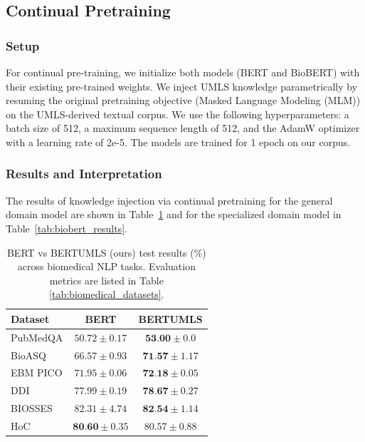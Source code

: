 \documentclass[10pt, a4paper]{article}
\begin{document}
\subsection{Continual Pretraining}
\subsubsection{Setup}
For continual pre-training, we initialize both models (BERT and BioBERT) with their existing pre-trained weights. We inject UMLS knowledge parametrically by resuming the original pretraining objective (Masked Language Modeling (MLM)) on the UMLS-derived textual corpus. We use the following hyperparameters: a batch size of 512, a maximum sequence length of 512, and the AdamW optimizer with a learning rate of 2e-5. The models are trained for 1 epoch on our corpus.
\subsubsection{Results and Interpretation}
The results of knowledge injection via continual pretraining for the general domain model are shown in Table~\ref{tab:bert_results} and for the specialized domain model in Table~\ref{tab:biobert_results}.
\begin{table}[H]
\centering
\begin{tabular}{|l|c|c|}
\hline
 Dataset & BERT & BERTUMLS  \\
\hline
PubMedQA &  $50.72 \pm 0.17  $&  $\textbf{53.00} \pm 0.0 $ \\
\hline
BioASQ   &$ 66.57 \pm 0.93  $&  $\textbf{71.57} \pm 1.17 $ \\
\hline
EBM PICO &$ 71.95\pm 0.06 $ & $\textbf{72.18}\pm 0.05 $\\
\hline
 DDI &$ 77.99 \pm 0.19 $&  $\textbf{78.67}\pm 0.27  $\\
\hline
BIOSSES & $82.31\pm 4.74 $& $\textbf{82.54}\pm 1.14 $ \\
\hline
 HoC & $\textbf{80.60}\pm 0.35 $ &$ 80.57 \pm 0.88 $\\
\hline
\end{tabular}
\caption{BERT vs BERTUMLS (ours) test results (\%) across biomedical NLP tasks. Evaluation metrics are listed in Table \ref{tab:biomedical_datasets}.}
\label{tab:bert_results}
\end{table}
\end{document}
